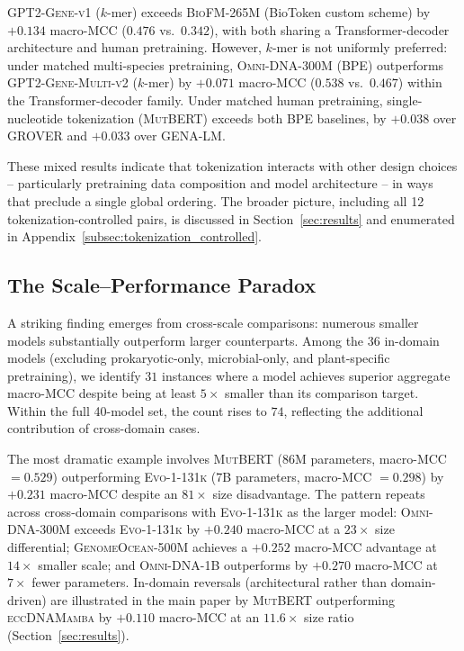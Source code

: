 \documentclass{llmxive}
\begin{document}
\textsc{GPT2-Gene-v1} ($k$-mer) exceeds \textsc{BioFM-265M} (BioToken
custom scheme) by $+0.134$ macro-MCC ($0.476$ vs.\ $0.342$), with both
sharing a Transformer-decoder architecture and human pretraining.
However, $k$-mer is not uniformly preferred: under matched
multi-species pretraining, \textsc{Omni-DNA-300M} (BPE) outperforms
\textsc{GPT2-Gene-Multi-v2} ($k$-mer) by $+0.071$ macro-MCC ($0.538$
vs.\ $0.467$) within the Transformer-decoder family. Under matched
human pretraining, single-nucleotide tokenization (\textsc{MutBERT})
exceeds both BPE baselines, by $+0.038$ over \textsc{GROVER} and
$+0.033$ over \textsc{GENA-LM}.

These mixed results indicate that tokenization interacts with other
design choices -- particularly pretraining data composition and model
architecture -- in ways that preclude a single global ordering. The
broader picture, including all 12 tokenization-controlled pairs, is
discussed in Section~\ref{sec:results} and enumerated in
Appendix~\ref{subsec:tokenization_controlled}.

\subsection{The Scale--Performance Paradox}
\label{subsec:paradox}

A striking finding emerges from cross-scale comparisons: numerous
smaller models substantially outperform larger counterparts. Among
the $36$ in-domain models (excluding prokaryotic-only, microbial-only,
and plant-specific pretraining), we identify $31$ instances where a
model achieves superior aggregate macro-MCC despite being at least
$5\times$ smaller than its comparison target. Within the full
40-model set, the count rises to $74$, reflecting the additional
contribution of cross-domain cases.

The most dramatic example involves \textsc{MutBERT} (86M parameters,
macro-MCC $= 0.529$) outperforming \textsc{Evo-1-131k} (7B parameters,
macro-MCC $= 0.298$) by $+0.231$ macro-MCC despite an
$81\times$ size disadvantage. The pattern repeats across cross-domain
comparisons with \textsc{Evo-1-131k} as the larger model:
\textsc{Omni-DNA-300M} exceeds \textsc{Evo-1-131k} by
$+0.240$ macro-MCC at a $23\times$ size differential;
\textsc{GenomeOcean-500M} achieves a $+0.252$ macro-MCC advantage at
$14\times$ smaller scale; and \textsc{Omni-DNA-1B} outperforms by
$+0.270$ macro-MCC at $7\times$ fewer parameters. In-domain
reversals (architectural rather than domain-driven) are illustrated
in the main paper by \textsc{MutBERT} outperforming \textsc{eccDNAMamba}
by $+0.110$ macro-MCC at an $11.6\times$ size ratio
(Section~\ref{sec:results}).
\end{document}
